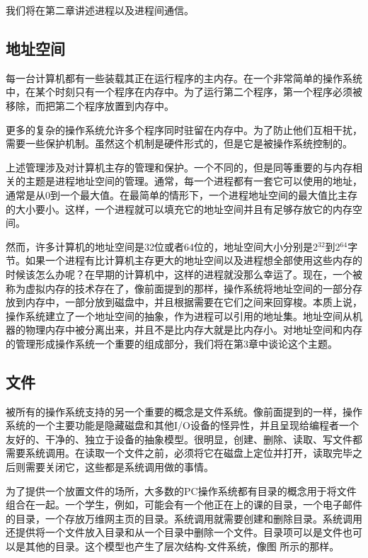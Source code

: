 	我们将在第二章讲述进程以及进程间通信。
	
	\subsection{地址空间}
	
	每一台计算机都有一些装载其正在运行程序的主内存。在一个非常简单的操作系统中，在某个时刻只有一个程序在内存中。为了运行第二个程序，第一个程序必须被移除，而把第二个程序放置到内存中。
	
	更多的复杂的操作系统允许多个程序同时驻留在内存中。为了防止他们互相干扰，需要一些保护机制。虽然这个机制是硬件形式的，但是它是被操作系统控制的。
	
	上述管理涉及对计算机主存的管理和保护。一个不同的，但是同等重要的与内存相关的主题是进程地址空间的管理。通常，每一个进程都有一套它可以使用的地址，通常是从0到一个最大值。在最简单的情形下，一个进程地址空间的最大值比主存的大小要小。这样，一个进程就可以填充它的地址空间并且有足够存放它的内存空间。
	
	然而，许多计算机的地址空间是32位或者64位的，地址空间大小分别是2$^{32}$到2$^{64}$字节。如果一个进程有比计算机主存更大的地址空间以及进程想全部使用这些内存的时候该怎么办呢？在早期的计算机中，这样的进程就没那么幸运了。现在，一个被称为虚拟内存的技术存在了，像前面提到的那样，操作系统将地址空间的一部分存放到内存中，一部分放到磁盘中，并且根据需要在它们之间来回穿梭。本质上说，操作系统建立了一个地址空间的抽象，作为进程可以引用的地址集。地址空间从机器的物理内存中被分离出来，并且不是比内存大就是比内存小。对地址空间和内存的管理形成操作系统一个重要的组成部分，我们将在第3章中谈论这个主题。
	
	\subsection{文件}
	
	被所有的操作系统支持的另一个重要的概念是文件系统。像前面提到的一样，操作系统的一个主要功能是隐藏磁盘和其他I/O设备的怪异性，并且呈现给编程者一个友好的、干净的、独立于设备的抽象模型。很明显，创建、删除、读取、写文件都需要系统调用。在读取一个文件之前，必须将它在磁盘上定位并打开，读取完毕之后则需要关闭它，这些都是系统调用做的事情。
	
	为了提供一个放置文件的场所，大多数的PC操作系统都有目录的概念用于将文件组合在一起。一个学生，例如，可能会有一个他正在上的课的目录，一个电子邮件的目录，一个存放万维网主页的目录。系统调用就需要创建和删除目录。系统调用还提供将一个文件放入目录和从一个目录中删除一个文件。目录项可以是文件也可以是其他的目录。这个模型也产生了层次结构-文件系统，像图 所示的那样。
	
